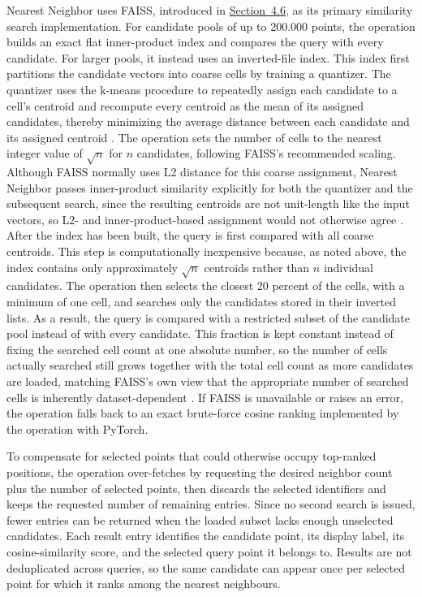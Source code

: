 Nearest Neighbor uses FAISS, introduced in \hyperref[sec:4.6]{Section~4.6}, as its primary similarity search implementation. For candidate pools of up to 200.000 points, the operation builds an exact flat inner-product index and compares the query with every candidate. For larger pools, it instead uses an inverted-file index. This index first partitions the candidate vectors into coarse cells by training a quantizer. The quantizer uses the k-means procedure to repeatedly assign each candidate to a cell's centroid and recompute every centroid as the mean of its assigned candidates, thereby minimizing the average distance between each candidate and its assigned centroid \cite{douze2025faisslibrary}. The operation sets the number of cells to the nearest integer value of $\sqrt{n}$ for $n$ candidates, following FAISS's recommended scaling. Although FAISS normally uses L2 distance for this coarse assignment, Nearest Neighbor passes inner-product similarity explicitly for both the quantizer and the subsequent search, since the resulting centroids are not unit-length like the input vectors, so L2- and inner-product-based assignment would not otherwise agree \cite{douze2025faisslibrary}. After the index has been built, the query is first compared with all coarse centroids. This step is computationally inexpensive because, as noted above, the index contains only approximately $\sqrt{n}$ centroids rather than $n$ individual candidates. The operation then selects the closest 20 percent of the cells, with a minimum of one cell, and searches only the candidates stored in their inverted lists. As a result, the query is compared with a restricted subset of the candidate pool instead of with every candidate.
This fraction is kept constant instead of fixing the searched cell count at one absolute number, so the number of cells actually searched still grows together with the total cell count as more candidates are loaded, matching FAISS's own view that the appropriate number of searched cells is inherently dataset-dependent \cite{douze2025faisslibrary}. If FAISS is unavailable or raises an error, the operation falls back to an exact brute-force cosine ranking implemented by the operation with PyTorch.

To compensate for selected points that could otherwise occupy top-ranked positions, the operation over-fetches by requesting the desired neighbor count plus the number of selected points, then discards the selected identifiers and keeps the requested number of remaining entries. Since no second search is issued, fewer entries can be returned when the loaded subset lacks enough unselected candidates. Each result entry identifies the candidate point, its display label, its cosine-similarity score, and the selected query point it belongs to. Results are not deduplicated across queries, so the same candidate can appear once per selected point for which it ranks among the nearest neighbours.

